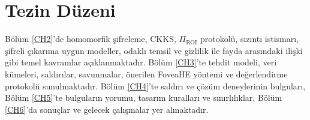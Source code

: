 \section{Tezin Düzeni}\label{duzen}

Bölüm \ref{CH2}'de homomorfik şifreleme, CKKS, $\Pi_{\mathrm{ROI}}$ protokolü, sızıntı istismarı, şifreli çıkarıma uygun modeller, odaklı temsil ve gizlilik ile fayda arasındaki ilişki gibi temel kavramlar açıklanmaktadır. Bölüm \ref{CH3}'te tehdit modeli, veri kümeleri, saldırılar, savunmalar, önerilen FoveaHE yöntemi ve değerlendirme protokolü sunulmaktadır. Bölüm \ref{CH4}'te saldırı ve çözüm deneylerinin bulguları, Bölüm \ref{CH5}'te bulguların yorumu, tasarım kuralları ve sınırlılıklar, Bölüm \ref{CH6}'da sonuçlar ve gelecek çalışmalar yer almaktadır.
